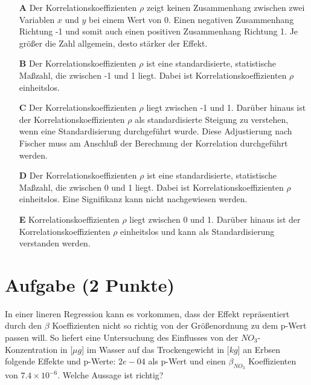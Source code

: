 \documentclass[a4paper, 9pt]{scrartcl}\usepackage[]{graphicx}\usepackage[]{xcolor}
\begin{document}
\begin{enumerate}
\item [\textbf{A} \msquare] Der Korrelationskoeffizienten $\rho$ zeigt keinen Zusammenhang zwischen zwei Variablen $x$ und $y$ bei einem Wert von 0. Einen negativen Zusammenhang Richtung -1 und somit auch einen positiven Zusammenhang Richtung 1. Je größer die Zahl allgemein, desto stärker der Effekt.
\item [\textbf{B} \msquare] Der Korrelationskoeffizienten $\rho$ ist eine standardisierte, statistische Maßzahl, die zwischen -1 und 1 liegt. Dabei ist Korrelationskoeffizienten $\rho$ einheitslos.
\item [\textbf{C} \msquare] Der Korrelationskoeffizienten $\rho$ liegt zwischen -1 und 1. Darüber hinaus ist der Korrelationskoeffizienten $\rho$ als standardisierte Steigung zu verstehen, wenn eine Standardisierung durchgeführt wurde. Diese Adjustierung nach Fischer muss am Anschluß der Berechnung der Korrelation durchgeführt werden.
\item [\textbf{D} \msquare] Der Korrelationskoeffizienten $\rho$ ist eine standardisierte, statistische Maßzahl, die zwischen 0 und 1 liegt. Dabei ist Korrelationskoeffizienten $\rho$ einheitslos. Eine Signifikanz kann nicht nachgewiesen werden.
\item [\textbf{E} \msquare] Korrelationskoeffizienten $\rho$ liegt zwischen 0 und 1. Darüber hinaus ist der Korrelationskoeffizienten $\rho$ einheitslos und kann als Standardisierung verstanden werden.
\end{enumerate}

\section{Aufgabe \hfill (2 Punkte)}



In einer lineren Regression kann es vorkommen, dass der Effekt repräsentiert durch den $\beta$ Koeffizienten nicht so richtig von der Größenordnung zu dem p-Wert passen will. So liefert eine Untersuchung des Einflusses von der $NO_3$-Konzentration in [$\mu g$] im Wasser auf das Trockengewicht in [$kg$] an Erbsen folgende Effekte und p-Werte: $2e-04$ als p-Wert und einen $\beta_{NO_3}$ Koeffizienten von $7.4\times 10^{-6}$. Welche Aussage ist richtig?
\end{document}
